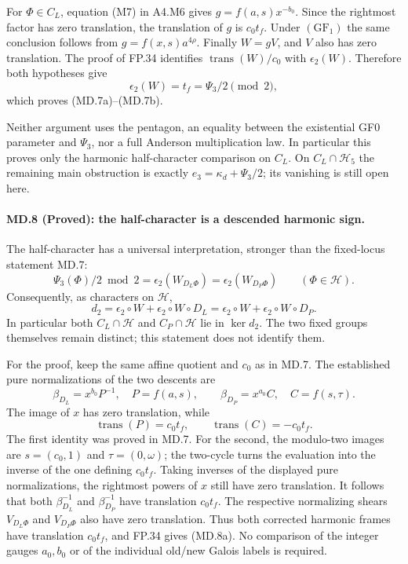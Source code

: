 For $\Phi\in C_L$, equation (M7) in A4.M6 gives
$g=f(a,s)x^{-b_0}$. Since the rightmost factor has zero
translation, the translation of $g$ is $c_0t_f$.
Under $(\mathrm{GF}_1)$ the same conclusion follows from
$g=f(x,s)a^{4\rho}$. Finally $W=gV$, and $V$ also has
zero translation. The proof of FP.34 identifies
$\operatorname{trans}(W)/c_0$ with $\epsilon_2(W)$.
Therefore both hypotheses give
\[
 \epsilon_2(W)=t_f=\Psi_3/2\pmod2,
\]
which proves (MD.7a)--(MD.7b).

Neither argument uses the pentagon, an equality between the
existential GF0 parameter and $\Psi_3$, nor a full Anderson
multiplication law. In particular this proves only the harmonic
half-character comparison on $C_L$. On
$C_L\cap\mathcal H_5$ the remaining main obstruction is exactly
$e_3=\kappa_d+\Psi_3/2$; its vanishing is still open here.

\paragraph{MD.8 (Proved): the half-character is a descended harmonic sign.}
The half-character has a universal interpretation, stronger than
the fixed-locus statement MD.7:
\[
 \boxed{\quad
 \Psi_3(\Phi)/2\bmod2
 =\epsilon_2(W_{D_L\Phi})
 =\epsilon_2(W_{D_P\Phi})
 \qquad(\Phi\in\mathcal H).
 \quad}
 \tag{MD.8a}
\]
Consequently, as characters on $\mathcal H$,
\[
 d_2=\epsilon_2\circ W+\epsilon_2\circ W\circ D_L
     =\epsilon_2\circ W+\epsilon_2\circ W\circ D_P.
 \tag{MD.8b}
\]
In particular both $C_L\cap\mathcal H$ and
$C_P\cap\mathcal H$ lie in $\ker d_2$. The two fixed groups
themselves remain distinct; this statement does not identify them.

For the proof, keep the same affine quotient and $c_0$ as in MD.7.
The established pure normalizations of the two descents are
\[
 \beta_{D_L}=x^{b_0}P^{-1},\quad P=f(a,s),\qquad
 \beta_{D_P}=x^{a_0}C,\quad C=f(s,\tau).
\]
The image of $x$ has zero translation, while
\[
 \operatorname{trans}(P)=c_0t_f,\qquad
 \operatorname{trans}(C)=-c_0t_f.
\]
The first identity was proved in MD.7. For the second, the
modulo-two images are $s=(c_0,1)$ and $\tau=(0,\omega)$;
the two-cycle turns the evaluation into the inverse of the
one defining $c_0t_f$.
Taking inverses of the displayed pure normalizations, the
rightmost powers of $x$ still have zero translation. It follows
that both $\beta_{D_L}^{-1}$ and $\beta_{D_P}^{-1}$ have
translation $c_0t_f$. The respective normalizing shears
$V_{D_L\Phi}$ and $V_{D_P\Phi}$ also have zero translation.
Thus both corrected harmonic frames have translation $c_0t_f$,
and FP.34 gives (MD.8a). No comparison of the integer gauges
$a_0,b_0$ or of the individual old/new Galois labels is required.

